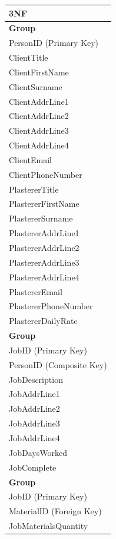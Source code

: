 \begin{flushleft}
    \begin{longtable}{|p{12cm}|}
                \hline
 			\textbf{3NF} \\ \hline
         \textbf{Group} \\ \hline
			PersonID (Primary Key) \\ 
         ClientTitle \\
			ClientFirstName \\
			ClientSurname \\
			ClientAddrLine1 \\
			ClientAddrLine2 \\
			ClientAddrLine3 \\
			ClientAddrLine4 \\
			ClientEmail \\
			ClientPhoneNumber \\
			PlastererTitle \\
			PlastererFirstName \\
			PlastererSurname \\
			PlastererAddrLine1 \\
			PlastererAddrLine2 \\
			PlastererAddrLine3 \\
			PlastererAddrLine4 \\
			PlastererEmail \\
			PlastererPhoneNumber \\
			PlastererDailyRate \\ \hline

			\textbf{Group} \\ \hline
			JobID (Primary Key) \\
			PersonID (Composite Key) \\
         JobDescription \\
			JobAddrLine1 \\
			JobAddrLine2 \\
			JobAddrLine3 \\
			JobAddrLine4 \\
			JobDaysWorked \\
			JobComplete \\ \hline
		
			\textbf{Group} \\ \hline
			JobID (Primary Key) \\ 
			MaterialID (Foreign Key) \\
			JobMaterialsQuantity \\ \hline



\end{longtable}
\end{flushleft}
